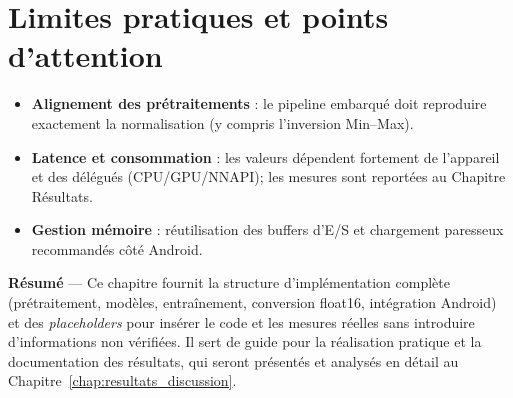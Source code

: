 

\section{Limites pratiques et points d’attention}
\label{sec:limites}
\begin{itemize}
    \item \textbf{Alignement des prétraitements} : le pipeline embarqué doit reproduire exactement la normalisation (y compris l’inversion Min--Max).
    \item \textbf{Latence et consommation} : les valeurs dépendent fortement de l’appareil et des délégués (CPU/GPU/NNAPI); les mesures sont reportées au Chapitre Résultats.
    \item \textbf{Gestion mémoire} : réutilisation des buffers d’E/S et chargement paresseux recommandés côté Android.
\end{itemize}

\bigskip
\noindent \textbf{Résumé} — Ce chapitre fournit la structure d’implémentation complète (prétraitement, modèles, entraînement, conversion float16, intégration Android) et des \textit{placeholders} pour insérer le code et les mesures réelles sans introduire d’informations non vérifiées.
Il sert de guide pour la réalisation pratique et la documentation des résultats, qui seront présentés et analysés en détail au Chapitre~\ref{chap:resultats_discussion}.